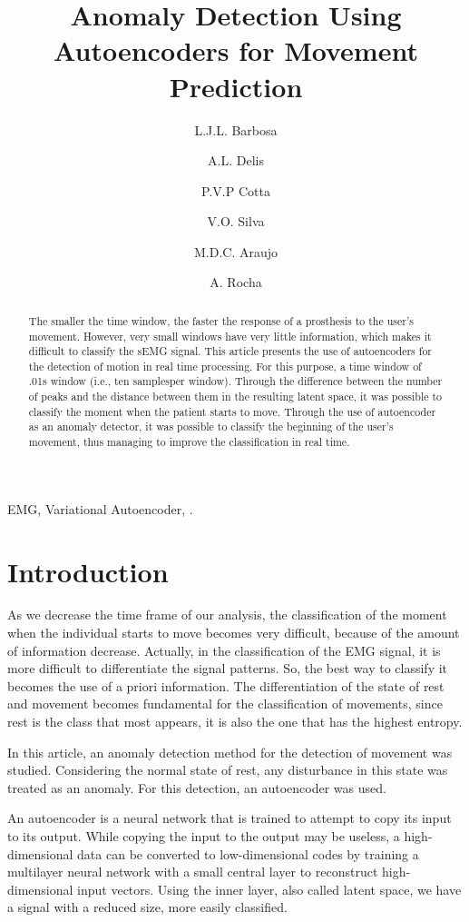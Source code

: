 \documentclass[nouppercase]{ifmbe}
\title{Anomaly Detection Using Autoencoders for Movement Prediction}
\affiliation{Universidade de Brasília/Engenharia Biomédica, Brasília, Brasil }{FIRSTAFF}
\affiliation{Medical Biophysic Center, Santiago de Cuba, Cuba }{SECONDAFF}
\author{L.J.L. Barbosa}{FIRSTAFF}
\author{A.L. Delis}{SECONDAFF}
\author{P.V.P Cotta}{FIRSTAFF}
\author{V.O. Silva}{FIRSTAFF}
\author{M.D.C. Araujo}{FIRSTAFF}
\author{A. Rocha}{FIRSTAFF}
\begin{document}
\maketitle

\begin{abstract}

The smaller the time window, the faster the response of a prosthesis to the user's movement. However, very small windows have very little information, which makes it difficult to classify the sEMG signal. This article presents the use of autoencoders for the detection of motion in real time processing. For this purpose, a time window of .01s window (i.e., ten samplesper window). Through the difference between the number of peaks and the distance between them in the resulting latent space, it was possible to classify the moment when the patient starts to move. Through the use of autoencoder as an anomaly detector, it was possible to classify the beginning of the user's movement, thus managing to improve the classification in real time.

\end{abstract}

\begin{keywords}
EMG, Variational Autoencoder, .
\end{keywords}

\section{Introduction}

As we decrease the time frame of our analysis, the classification of the moment when the individual starts to move becomes very difficult, because of the amount of information decrease. Actually, in the classification of the EMG signal, it is more difficult to differentiate the signal patterns. So, the best way to classify it becomes the use of a priori information. The differentiation of the state of rest and movement becomes fundamental for the classification of movements, since rest is the class that most appears, it is also the one that has the highest entropy.

In this article, an anomaly detection method for the detection of movement was studied. Considering the normal state of rest, any disturbance in this state was treated as an anomaly. For this detection, an autoencoder was used.

An autoencoder is a neural network that is trained to attempt to copy its input to its output. While copying the input to the output may be useless, a high-dimensional data can be converted to low-dimensional codes by training a multilayer neural network with a small central layer to reconstruct high-dimensional input vectors. Using the inner layer, also called latent space, we have a signal with a reduced size, more easily classified.
\end{document}

